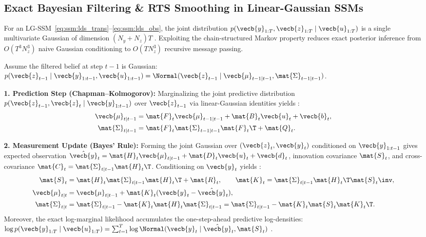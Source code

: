 \documentclass[../../../../master.tex]{subfiles}
\begin{document}
\subsection{Exact Bayesian Filtering \& RTS Smoothing in Linear-Gaussian SSMs}

For an LG-SSM~\eqref{eq:ssm:lds_trans}--\eqref{eq:ssm:lds_obs}, the joint distribution $p(\vecb{y}_{1:T}, \vecb{z}_{1:T} \mid \vecb{u}_{1:T})$ is a single multivariate Gaussian of dimension $(N_y + N_z)T$ . Exploiting the chain-structured Markov property reduces exact posterior inference from $O(T^3 N_z^3)$ naive Gaussian conditioning to $O(T N_z^3)$ recursive message passing.

\begin{coremath}
Assume the filtered belief at step $t-1$ is Gaussian: $p(\vecb{z}_{t-1} \mid \vecb{y}_{1:t-1}, \vecb{u}_{1:t-1}) = \Normal(\vecb{z}_{t-1} \mid \vecb{\mu}_{t-1|t-1}, \mat{\Sigma}_{t-1|t-1})$.

\textbf{1. Prediction Step (Chapman--Kolmogorov):} Marginalizing the joint predictive distribution $p(\vecb{z}_{t-1}, \vecb{z}_t \mid \vecb{y}_{1:t-1})$ over $\vecb{z}_{t-1}$ via linear-Gaussian identities yields :
\begin{align}
  \vecb{\mu}_{t|t-1} &= \mat{F}_t \vecb{\mu}_{t-1|t-1} + \mat{B}_t \vecb{u}_t + \vecb{b}_t, \label{eq:ssm:kf_pred_mean} \\
  \mat{\Sigma}_{t|t-1} &= \mat{F}_t \mat{\Sigma}_{t-1|t-1} \mat{F}_t\T + \mat{Q}_t. \label{eq:ssm:kf_pred_cov}
\end{align}

\textbf{2. Measurement Update (Bayes' Rule):} Forming the joint Gaussian over $(\vecb{z}_t, \vecb{y}_t)$ conditioned on $\vecb{y}_{1:t-1}$ gives expected observation $\hat{\vecb{y}}_t = \mat{H}_t\vecb{\mu}_{t|t-1} + \mat{D}_t\vecb{u}_t + \vecb{d}_t$, innovation covariance $\mat{S}_t$, and cross-covariance $\mat{C}_t = \mat{\Sigma}_{t|t-1}\mat{H}_t\T$. Conditioning on $\vecb{y}_t$ yields :
\begin{align}
  \mat{S}_t &= \mat{H}_t \mat{\Sigma}_{t|t-1} \mat{H}_t\T + \mat{R}_t, \qquad \mat{K}_t = \mat{\Sigma}_{t|t-1}\mat{H}_t\T \mat{S}_t\inv, \label{eq:ssm:kf_gain} \\
  \vecb{\mu}_{t|t} &= \vecb{\mu}_{t|t-1} + \mat{K}_t (\vecb{y}_t - \hat{\vecb{y}}_t), \label{eq:ssm:kf_upd_mean} \\
  \mat{\Sigma}_{t|t} &= \mat{\Sigma}_{t|t-1} - \mat{K}_t \mat{H}_t \mat{\Sigma}_{t|t-1} = \mat{\Sigma}_{t|t-1} - \mat{K}_t \mat{S}_t \mat{K}_t\T. \label{eq:ssm:kf_upd_cov}
\end{align}
Moreover, the exact log-marginal likelihood accumulates the one-step-ahead predictive log-densities: $\log p(\vecb{y}_{1:T} \mid \vecb{u}_{1:T}) = \sum_{t=1}^T \log \Normal(\vecb{y}_t \mid \hat{\vecb{y}}_t, \mat{S}_t)$ .


\end{coremath}
\end{document}
